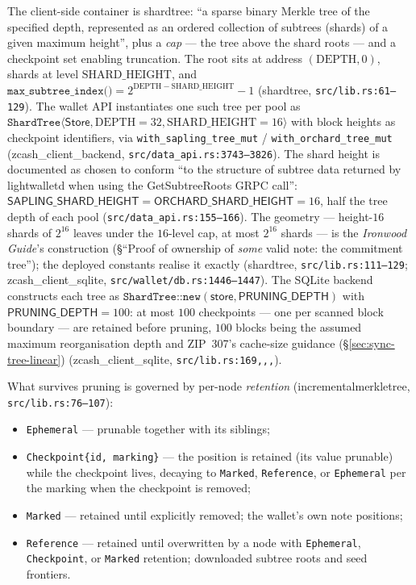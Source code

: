 \documentclass[11pt,a4paper]{article}
\theoremstyle{definition}
\begin{document}
The client-side container is \textsf{shardtree}: ``a sparse binary
Merkle tree of the specified depth, represented as an ordered collection
of subtrees (shards) of a given maximum height'', plus a \emph{cap} ---
the tree above the shard roots --- and a checkpoint set enabling
truncation. The root sits at address $(\mathrm{DEPTH}, 0)$, shards at
level $\mathrm{SHARD\_HEIGHT}$, and
$\texttt{max\_subtree\_index()} =
2^{\mathrm{DEPTH} - \mathrm{SHARD\_HEIGHT}} - 1$
(\textsf{shardtree}, \texttt{src/lib.rs:61--129}). The wallet API
instantiates one such tree per pool as
$\texttt{ShardTree}\langle \mathsf{Store}, \mathrm{DEPTH} = 32,
\mathrm{SHARD\_HEIGHT} = 16 \rangle$ with block heights as checkpoint
identifiers, via \texttt{with\_sapling\_tree\_mut} /
\texttt{with\_orchard\_tree\_mut}
(\textsf{zcash\_client\_backend}, \texttt{src/data\_api.rs:3743--3826}).
The shard height is documented as chosen to conform ``to the structure
of subtree data returned by lightwalletd when using the GetSubtreeRoots
GRPC call'': $\mathsf{SAPLING\_SHARD\_HEIGHT} =
\mathsf{ORCHARD\_SHARD\_HEIGHT} = 16$, half the tree depth of each pool
(\texttt{src/data\_api.rs:155--166}). The geometry --- height-$16$
shards of $2^{16}$ leaves under the $16$-level cap, at most $2^{16}$
shards --- is the \emph{Ironwood Guide}'s construction (\S``Proof of
ownership of \emph{some} valid note: the commitment tree''); the
deployed constants realise it exactly (\textsf{shardtree},
\texttt{src/lib.rs:111--129};
\textsf{zcash\_client\_sqlite}, \texttt{src/wallet/db.rs:1446--1447}).
The SQLite backend constructs each tree as
$\texttt{ShardTree::new}(\mathsf{store}, \mathsf{PRUNING\_DEPTH})$ with
$\mathsf{PRUNING\_DEPTH} = 100$: at most $100$ checkpoints --- one per
scanned block boundary --- are retained before pruning, $100$ blocks
being the assumed maximum reorganisation depth and ZIP~307's cache-size
guidance (\S\ref{sec:sync-tree-linear})
(\textsf{zcash\_client\_sqlite},
\texttt{src/lib.rs:169,,,}).

What survives pruning is governed by per-node \emph{retention}
(\textsf{incrementalmerkletree}, \texttt{src/lib.rs:76--107}):
\begin{itemize}
\item \texttt{Ephemeral} --- prunable together with its siblings;
\item \texttt{Checkpoint\{id, marking\}} --- the position is retained
  (its value prunable) while the checkpoint lives, decaying to
  \texttt{Marked}, \texttt{Reference}, or \texttt{Ephemeral} per the
  marking when the checkpoint is removed;
\item \texttt{Marked} --- retained until explicitly removed; the wallet's
  own note positions;
\item \texttt{Reference} --- retained until overwritten by a node with
  \texttt{Ephemeral}, \texttt{Checkpoint}, or \texttt{Marked} retention;
  downloaded subtree roots and seed frontiers.
\end{itemize}
\end{document}
